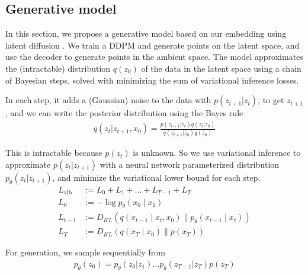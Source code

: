 \documentclass{article}
\theoremstyle{plain}
\theoremstyle{definition}
\theoremstyle{remark}
\begin{document}

\subsection{Generative model}
\par In this section, we propose a generative model based on our embedding using latent diffusion \cite{rombach2022high}. We train a DDPM \cite{dhariwal2021diffusion} and generate points on the latent space, and use the decoder to generate points in the ambient space.
The model approximates the (intractable) distribution  $q(z_0)$ of the data in the latent space using a chain of Bayesian steps, solved with minimizing the sum of variational inference losses.
\par In each step, it adds a (Gaussian) noise to the data with $p(z_{t+1}|z_t)$, to get $z_{t+1}$, and we can write the posterior distribution using the Bayes rule
\begin{align}
    q(z_t|z_{t+1},x_0)=\frac{p(z_{t+1}|z_t)q(z_{t}|z_0)}{q(z_{t+1}|z_0)q(z_0)}
\end{align}
\par This is intractable because $p(z_t)$ is unknown. So we use variational inference to approximate $p(z_t|z_{t+1})$ with a neural network parameterized distribution $p_{\theta}(z_t|z_{t+1})$, and minimize the variational lower bound for each step.
\begin{align}
L_{\mathrm{vlb}} & :=L_0+L_1+\ldots+L_{T-1}+L_T \\
L_0 & :=-\log p_\theta\left(x_0 \mid x_1\right) \\
L_{t-1} & :=D_{K L}\left(q\left(x_{t-1} \mid x_t, x_0\right) \| p_\theta\left(x_{t-1} \mid x_t\right)\right) \\
L_T & :=D_{K L}\left(q\left(x_T \mid x_0\right) \| p\left(x_T\right)\right)
\end{align}
\par For generation, we sample sequentially from 
\begin{align}
    p_{\theta}(z_0)=p_{\theta}(z_0|z_1)\dots p_\theta(z_{T-1}|z_{T})p(z_T)
\end{align}
\end{document}
